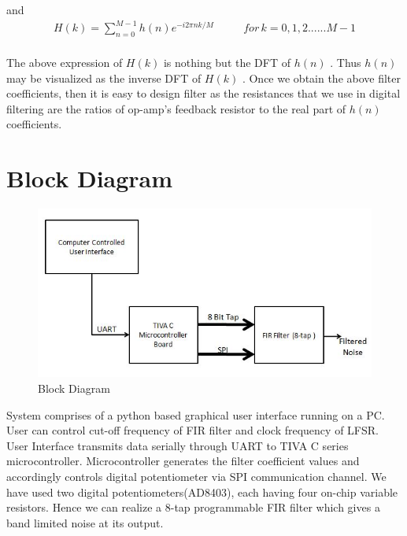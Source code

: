 \documentclass[a4paper,12pt]{article}
\begin{document}
   and
   \begin{equation}  
            \begin{aligned}
           H(k) = \sum_{n=0}^{M-1}h(n)e^{-i2\pi nk/M}          	\hspace{32pt}   for\hspace{2pt} k=0,1,2......M-1\\
            \end{aligned} 
            \end{equation}
  
      
   The above expression of $H(k)$ is nothing but the DFT of $h(n)$ . Thus $h(n)$ may be visualized as the inverse DFT of $H(k)$ . Once we obtain the above filter coefficients, then it is easy to design filter as the resistances that we use in digital filtering are the ratios of op-amp’s feedback resistor to the real part of $h(n)$ coefficients.
   

\section{Block Diagram}

\begin{figure}[!ht]
	\centering
	\includegraphics[scale=0.8]{block_dia}
	\caption{Block Diagram}
	\label{fig:block}
\end{figure}

System comprises of a python based graphical user interface running on a PC. User can control cut-off frequency of FIR filter and clock frequency of LFSR. User Interface transmits data serially through UART to TIVA C series microcontroller\cite{tiva}. Microcontroller generates the filter coefficient values and accordingly controls digital potentiometer via SPI communication channel. We have used two digital potentiometers(AD8403), each having four on-chip variable resistors. Hence we can realize a 8-tap programmable FIR filter which gives a band limited noise at its output.
   
\end{document}
